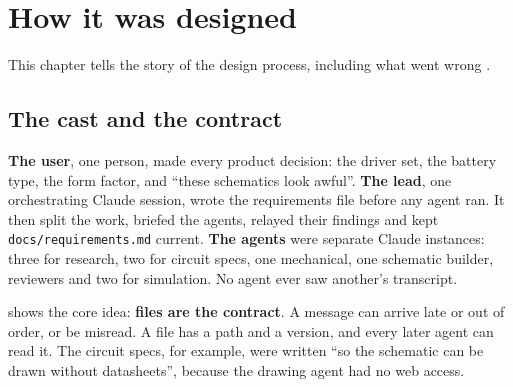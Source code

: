 \section{How it was designed}\label{sec:process}

This chapter tells the story of the design process, including what went wrong .

\subsection{The cast and the contract}

\textbf{The user}, one person, made every product decision: the driver set, the battery type, the form factor, and ``these schematics look awful''. \textbf{The lead}, one orchestrating Claude session, wrote the requirements file before any agent ran. It then split the work, briefed the agents, relayed their findings and kept \texttt{docs/requirements.md} current. \textbf{The agents} were separate Claude instances: three for research, two for circuit specs, one mechanical, one schematic builder, reviewers and two for simulation. No agent ever saw another's transcript.

 shows the core idea: \textbf{files are the contract}. A message can arrive late or out of order, or be misread. A file has a path and a version, and every later agent can read it. The circuit specs, for example, were written ``so the schematic can be drawn without datasheets'', because the drawing agent had no web access.

